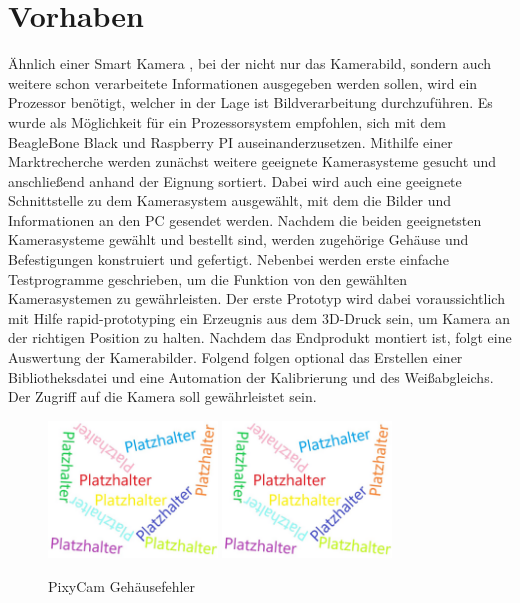 \section{Vorhaben}
Ähnlich einer Smart Kamera \cite{festo_dok}, bei der nicht nur das Kamerabild, sondern auch weitere schon verarbeitete Informationen ausgegeben werden sollen, wird ein Prozessor benötigt, welcher in der Lage ist Bildverarbeitung durchzuführen. Es wurde als Möglichkeit für ein Prozessorsystem empfohlen, sich mit dem BeagleBone Black und Raspberry PI auseinanderzusetzen. Mithilfe einer Marktrecherche werden zunächst weitere geeignete Kamerasysteme gesucht und anschließend anhand der Eignung sortiert. Dabei wird auch eine geeignete Schnittstelle zu dem Kamerasystem ausgewählt, mit dem die Bilder und Informationen an den PC gesendet werden. Nachdem die beiden geeignetsten Kamerasysteme gewählt und bestellt sind, werden zugehörige Gehäuse und Befestigungen konstruiert und gefertigt. Nebenbei werden erste einfache Testprogramme geschrieben, um die Funktion von den gewählten Kamerasystemen zu gewährleisten. Der erste Prototyp wird dabei voraussichtlich mit Hilfe rapid-prototyping ein Erzeugnis aus dem 3D-Druck sein, um Kamera an der richtigen Position zu halten. Nachdem das Endprodukt montiert ist, folgt eine Auswertung der Kamerabilder. Folgend folgen optional das Erstellen einer Bibliotheksdatei und eine Automation der Kalibrierung und des Weißabgleichs. Der Zugriff auf die Kamera soll gewährleistet sein. 

\begin{figure}[htb]
    \centering
    \includegraphics[width=0.4\textwidth]{Abbildungen/Platzhalter.jpg}
    \includegraphics[width=0.4\textwidth]{Abbildungen/Platzhalter.jpg}
    \caption{PixyCam Gehäusefehler}		
    \label{fig:Pixy_Fehler}
\end{figure}

